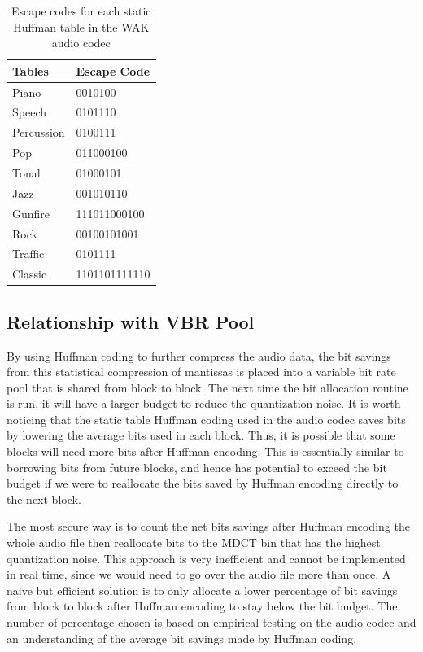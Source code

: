 \documentclass{vldb}
\begin{document}
\begin{table}[ht]
  \centering
    \begin{tabular}{ | l | l | }
      \hline
      Tables & Escape Code  \\
      \hline
      Piano     & 0010100     \\
      Speech     & 0101110    \\
      Percussion   & 0100111 \\   
      Pop     & 011000100 \\    
      Tonal     & 01000101 \\     
      Jazz     & 001010110\\ 
      Gunfire & 111011000100 \\
      Rock    & 00100101001 \\
      Traffic  & 0101111 \\
      Classic  & 1101101111110 \\
      \hline
    \end{tabular}
  \caption{Escape codes for each static Huffman table in the WAK audio codec}
  \label{table:huffmanescape}
\end{table}

\subsection{Relationship with VBR Pool}
By using Huffman coding to further compress the audio data, the bit savings from this statistical compression of mantissas is placed into a variable bit rate pool that is shared from block to block. The next time the bit allocation routine is run, it will have a larger budget to reduce the quantization noise. It is worth noticing that the static table Huffman coding used in the audio codec saves bits by lowering the average bits used in each block. Thus, it is possible that some blocks will need more bits after Huffman encoding. This is essentially similar to borrowing bits from future blocks, and hence has potential to exceed the bit budget if we were to reallocate the bits saved by Huffman encoding directly to the next block.

The most secure way is to count the net bits savings after Huffman encoding the whole audio file then reallocate bits to the MDCT bin that has the highest quantization noise. This approach is very inefficient and cannot be implemented in real time, since we would need to go over the audio file more than once. A naive but efficient solution is to only allocate a lower percentage of bit savings from block to block after Huffman encoding to stay below the bit budget. The number of percentage chosen is based on empirical testing on the audio codec and an understanding of the average bit savings made by Huffman coding. 
\end{document}
